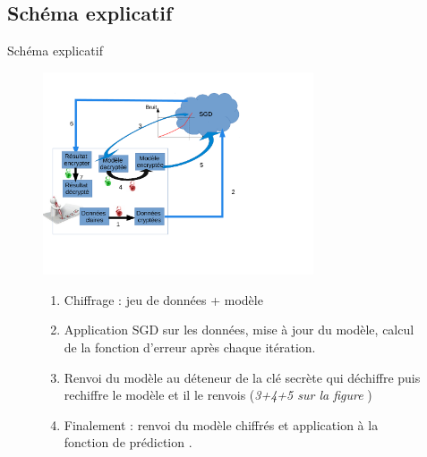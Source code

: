 \documentclass{beamer}
\begin{document}
\subsection{Schéma explicatif}
  \begin{frame}{Schéma explicatif}
  \begin{figure}
   \begin{minipage}[c]{.44\linewidth}
      \includegraphics[width=8cm]{SGD.pdf}
   \end{minipage} \hfill
   \begin{minipage}[c]{.48\linewidth}
      \begin{enumerate}
    		\item {Chiffrage : jeu de données + modèle}
  			\item {Application SGD sur les données, mise à jour du modèle, calcul de la fonction d'erreur après chaque itération. }
  			\item {Renvoi du modèle au déteneur de la clé secrète qui déchiffre puis rechiffre le modèle et il le renvois {\tiny(\textit{3+4+5 sur la figure}  )} }
    		\item {Finalement : renvoi du modèle chiffrés et application à la fonction de prédiction .}
		\end{enumerate}
   \end{minipage}
\end{figure}
             \end{frame}
\end{document}
